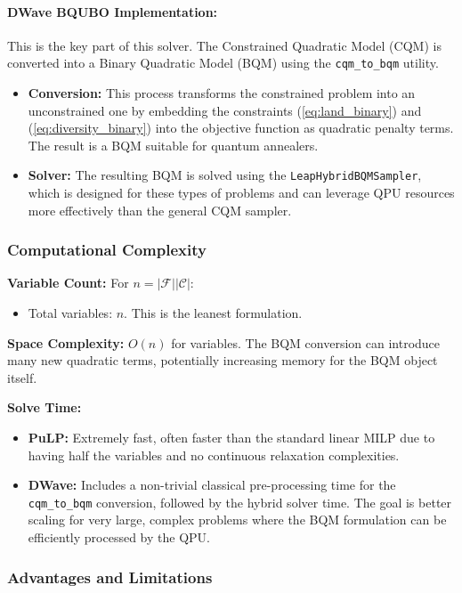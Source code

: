 \documentclass[11pt,a4paper]{article}
\begin{document}
\paragraph{DWave BQUBO Implementation:}
This is the key part of this solver. The Constrained Quadratic Model (CQM) is converted into a Binary Quadratic Model (BQM) using the \texttt{cqm\_to\_bqm} utility.
\begin{itemize}
    \item \textbf{Conversion:} This process transforms the constrained problem into an unconstrained one by embedding the constraints (\ref{eq:land_binary}) and (\ref{eq:diversity_binary}) into the objective function as quadratic penalty terms. The result is a BQM suitable for quantum annealers.
    \item \textbf{Solver:} The resulting BQM is solved using the \texttt{LeapHybridBQMSampler}, which is designed for these types of problems and can leverage QPU resources more effectively than the general CQM sampler.
\end{itemize}

\subsubsection{Computational Complexity}

\textbf{Variable Count:} For $n = |\mathcal{F}||\mathcal{C}|$:
\begin{itemize}
    \item Total variables: $n$. This is the leanest formulation.
\end{itemize}

\textbf{Space Complexity:} $O(n)$ for variables. The BQM conversion can introduce many new quadratic terms, potentially increasing memory for the BQM object itself.

\textbf{Solve Time:}
\begin{itemize}
    \item \textbf{PuLP:} Extremely fast, often faster than the standard linear MILP due to having half the variables and no continuous relaxation complexities.
    \item \textbf{DWave:} Includes a non-trivial classical pre-processing time for the \texttt{cqm\_to\_bqm} conversion, followed by the hybrid solver time. The goal is better scaling for very large, complex problems where the BQM formulation can be efficiently processed by the QPU.
\end{itemize}

\subsubsection{Advantages and Limitations}
\end{document}
